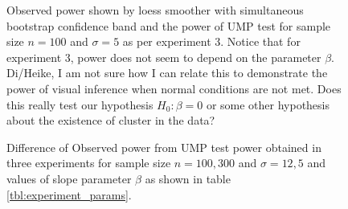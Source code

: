 \documentclass{article}
\begin{document}
\begin{figure}[hbtp]
   \centering
       \caption{Observed power shown by loess smoother with simultaneous bootstrap confidence band and the power of UMP test for sample size $n= 100$ and $\sigma = 5$ as per experiment 3. Notice that for experiment 3, power does not seem to depend on the parameter $\beta$. Di/Heike, I am not sure how I can relate this to demonstrate the power of visual inference when normal conditions are not met. Does this really test our hypothesis $H_0: \beta=0$ or some other hypothesis about the existence of cluster in the data?}
       \label{fig:power_loess3}
\end{figure}


\begin{figure}[hbtp]
   \centering
       \caption{Difference of Observed power from UMP test power obtained in three experiments for sample size $n= 100,300$ and $\sigma = 12,5$ and values of slope parameter $\beta$ as shown in table \ref{tbl:experiment_params}.}
       \label{fig:power_diff_exp}
\end{figure}
\end{document}
